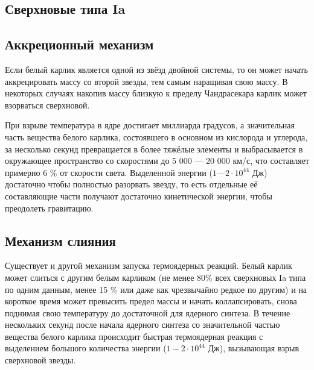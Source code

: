 \subsection{Сверхновые типа Ia}
\subsection{Аккреционный механизм}
Если белый карлик является одной из звёзд двойной системы, то он может начать аккрецировать массу со второй звезды, тем самым наращивая свою массу. В некоторых случаях накопив массу близкую к пределу Чандрасекара карлик может взорваться сверхновой.

При взрыве температура в ядре достигает миллиарда градусов, а значительная часть вещества белого карлика, состоявшего в основном из кислорода и углерода, за несколько секунд превращается в более тяжёлые элементы и выбрасывается в окружающее пространство со скоростями до 5 000 — 20 000 км/с, что составляет примерно 6 \% от скорости света. Выделенной энергии ($1—2\cdot10^{44}$ Дж) достаточно чтобы полностью разорвать звезду, то есть отдельные её составляющие части получают достаточно кинетической энергии, чтобы преодолеть гравитацию.
\subsection{Механизм слияния}
Существует и другой механизм запуска термоядерных реакций. Белый карлик может слиться с другим белым карликом (не менее 80\% всех сверхновых Ia типа по одним данным, менее 15 \% или даже как чрезвычайно редкое по другим) и на короткое время может превысить предел массы и начать коллапсировать, снова поднимая свою температуру до достаточной для ядерного синтеза. В течение нескольких секунд после начала ядерного синтеза со значительной частью вещества белого карлика происходит быстрая термоядерная реакция с выделением большого количества энергии ($1-2\cdot10^{44}$ Дж), вызывающая взрыв сверхновой звезды.
